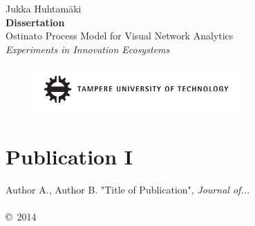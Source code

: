\documentclass[twoside,b5paper,openright]{memoir}
\newcommand{\todo}[1] {
\textbf{TODO}\textit{ #1}}
\newcommand*{\titleTH}{\begingroup %
\raggedleft %
\vspace*{\baselineskip} %

{\Large Jukka Huhtamäki}\\[0.167\textheight] %

{\LARGE\bfseries Dissertation}\\[\baselineskip] %

{{\huge Ostinato Process Model for Visual Network Analytics}}\\[\baselineskip] 
{\Large \textit{Experiments in Innovation Ecosystems}}\par 

\vfill 

\begin{figure}[htb]
\includegraphics[width=8cm]{figure/tut-logo.pdf}
\label{fig:tut-logo}
\end{figure}

\vspace*{3\baselineskip} %
\endgroup}
\begin{document}
\frontmatter
{}
\titleTH
\clearpage
{}
% 

% 

\cleardoublepage
\tableofcontents* %

% 


\mainmatter



% 
% 







\backmatter

%

% 
% 





% 


\renewcommand\appendixpagename{Publications}
\renewcommand\appendixtocname{Publications}

\appendix
\begingroup
\makeatletter
\let\ps@plain\ps@empty
\appendixpage
\makeatother
\endgroup

\chapter*{Publication I}
\thispagestyle{empty}
Author A., Author B. "Title of Publication", \emph{Journal of...}
\\\\
\noindent\copyright\ 2014 

% 
\end{document}

